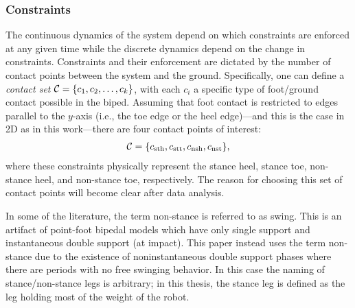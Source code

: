 
\subsubsection{Constraints}
The continuous dynamics of the system depend on which constraints are enforced
at any given time while the discrete dynamics depend on the change in constraints.
%
Constraints and their enforcement are dictated by the number of contact points
between the system and the ground.
%
Specifically, one can define a {\em contact set} $\mathcal{C} = \{c_{1}, c_{2}, \ldots,
c_{k}\}$, with each $c_i$ a specific type of foot/ground contact
possible in the biped.
%
Assuming that foot contact is restricted to edges parallel to the $y$-axis
(i.e., the toe edge or the heel edge)---and this is the case in 2D as in this
work---there are four contact points of interest:
\begin{align}
  \mathcal{C} =  \{c_{\mathrm{sth}}, c_{\mathrm{stt}}, c_{\mathrm{nsh}} , c_{\mathrm{nst}}\},
\end{align}
where these constraints physically represent the stance heel, stance toe,
non-stance heel, and non-stance toe, respectively.
%
The reason for choosing this set of contact points will become clear after data
analysis.

\begin{remark}
  In some of the literature, the term non-stance is referred to as swing.
  This is an artifact of point-foot bipedal models which have only single
  support and instantaneous double support (at impact).
  This paper instead uses the term non-stance due to the existence of
  noninstantaneous double support phases where there are periods with no free
  swinging behavior.
  In this case the naming of stance/non-stance legs is arbitrary;
  in this thesis, the stance leg is defined as the leg holding most of the weight
  of the robot.
\end{remark}



